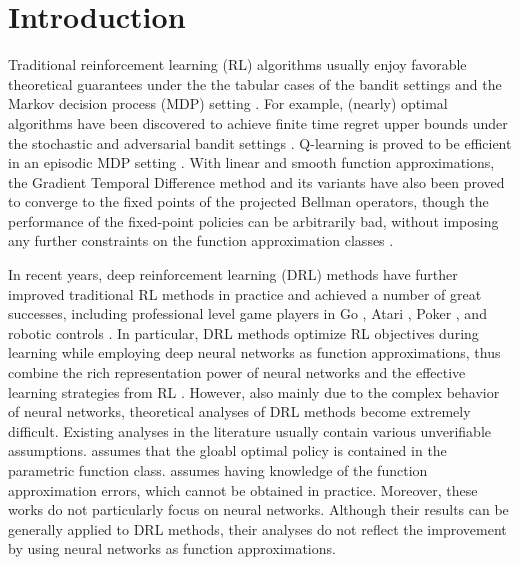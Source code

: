 \section{Introduction}
\label{sec:introduction}

Traditional reinforcement learning (RL) algorithms usually enjoy favorable theoretical guarantees under the the tabular cases of the bandit settings and the Markov decision process (MDP) setting \citep{sutton2018reinforcement}.
For example, (nearly) optimal algorithms have been discovered to achieve finite time regret upper bounds under the stochastic and adversarial bandit settings \citep{bubeck2012regret}. Q-learning is proved to be efficient in an episodic MDP setting \cite{jin2018q}. 
With linear and smooth function approximations, the Gradient Temporal Difference method and its variants have also been proved to converge to the fixed points of the projected Bellman operators, though the performance of the fixed-point policies can be arbitrarily bad, without imposing any further constraints on the function approximation classes \citep{sutton2009fast,sutton2009convergent,bhatnagar2009convergent}.

In recent years, deep reinforcement learning (DRL) methods have further improved traditional RL methods in practice and achieved a number of great successes, including professional level game players in Go \citep{silver2016masteringA,silver2017masteringB}, Atari \citep{mnih2015human}, Poker \citep{moravvcik2017deepstack}, and robotic controls \citep{lillicrap2015continuous,levine2016end}.
In particular, DRL methods optimize RL objectives during learning while employing deep neural networks as function approximations, thus combine the rich representation power of neural networks and the effective learning strategies from RL \citep{sutton2018reinforcement}. 
However, also mainly due to the complex behavior of neural networks, theoretical analyses of DRL methods become extremely difficult.
Existing analyses in the literature usually contain various unverifiable assumptions. \citep{krishnamurthy2016pac} assumes that the gloabl optimal policy is contained in the parametric function class. \citep{dai2018sbeed} assumes having knowledge of the function approximation errors, which cannot be obtained in practice.
Moreover, these works do not particularly focus on neural networks. Although their results can be generally applied to DRL methods, their analyses do not reflect the improvement by using neural networks as function approximations. 

